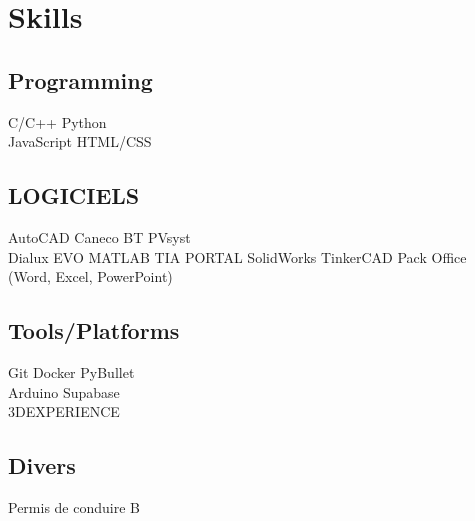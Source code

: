 \documentclass[]{plushcv}
\begin{document}
\begin{minipage}[t]{0.72\textwidth}
\vspace{-3pt}

%
%

\end{minipage} 
\hfill
\begin{minipage}[t]{0.24\textwidth} 

\section{Skills}
\sectionsep
\vspace{2pt}

\subsection{Programming}
\sectionsep
C/C++ \textbullet{} Python \textbullet{}\\ JavaScript \textbullet{} HTML/CSS
\sectionsep
\vspace{2pt}

\subsection{LOGICIELS}
\sectionsep
AutoCAD \textbullet{} Caneco BT \textbullet{} PVsyst \textbullet{} \\
Dialux EVO \textbullet{} MATLAB \textbullet{} TIA PORTAL \textbullet{} 
SolidWorks \textbullet{} TinkerCAD  \textbullet{} 
Pack Office \\(Word, Excel, PowerPoint)
\vspace{2pt}

\sectionsep
\subsection{Tools/Platforms}
\sectionsep
Git \textbullet{} Docker \textbullet{} PyBullet \\
Arduino \textbullet{} Supabase \textbullet{}\\ 3DEXPERIENCE \\
\sectionsep
\vspace{2pt}
\subsection{Divers}
\sectionsep
Permis de conduire B\\


\end{minipage}
\end{document}
